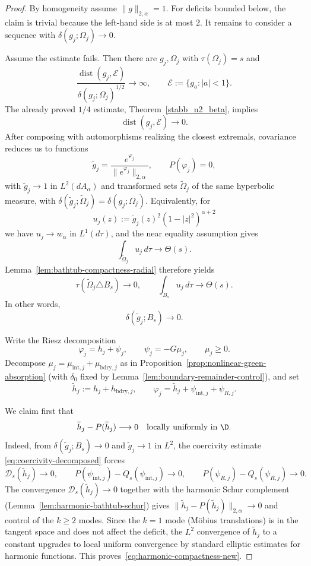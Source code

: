 \begin{proof}
By homogeneity assume $\|g\|_{2,\alpha}=1$. For deficits bounded below, the
claim is trivial because the left-hand side is at most $2$. It remains to
consider a sequence with $\delta(g_j;\Omega_j)\to0$.

Assume the estimate fails. Then there are $g_j,\Omega_j$ with
$\tau(\Omega_j)=s$ and
\[
\frac{\operatorname{dist}(g_j,\mathcal E)}
{\delta(g_j;\Omega_j)^{1/2}}\to\infty,
\qquad
\mathcal E:=\{g_a:|a|<1\}.
\]
The already proved $1/4$ estimate, Theorem~\ref{stabb_n2_beta}, implies
\[
\operatorname{dist}(g_j,\mathcal E)\to0.
\]
After composing with automorphisms realizing the closest extremals, covariance
reduces us to functions
\[
\widetilde g_j=\frac{e^{\varphi_j}}{\|e^{\varphi_j}\|_{2,\alpha}},
\qquad
P(\varphi_j)=0,
\]
with $\widetilde g_j\to1$ in $L^2(dA_\alpha)$ and transformed sets
$\widetilde\Omega_j$ of the same hyperbolic measure, with
$\delta(\widetilde g_j;\widetilde\Omega_j)=\delta(g_j;\Omega_j)$.
Equivalently, for
\[
u_j(z):=
\widetilde g_j(z)^2(1-|z|^2)^{\alpha+2}
\]
we have $u_j\to w_\alpha$ in $L^1(d\tau)$, and the near equality assumption
gives
\[
\int_{\widetilde\Omega_j}u_j\,d\tau\longrightarrow\Theta(s).
\]
Lemma~\ref{lem:bathtub-compactness-radial} therefore yields
\[
\tau(\widetilde\Omega_j\triangle B_s)\to0,
\qquad
\int_{B_s}u_j\,d\tau\to\Theta(s).
\]
In other words,
\[
\delta(\widetilde g_j;B_s)\to0.
\]

Write the Riesz decomposition
\[
\varphi_j=h_j+\psi_j,\qquad
\psi_j=-G\mu_j,\qquad \mu_j\ge0.
\]
Decompose $\mu_j=\mu_{\mathrm{int},j}+\mu_{\mathrm{bdry},j}$ as in
Proposition~\ref{prop:nonlinear-green-absorption} (with $\delta_0$ fixed by
Lemma~\ref{lem:boundary-remainder-control}), and set
\[
\widetilde h_j:=h_j+h_{\mathrm{bdry},j},\qquad
\varphi_j=\widetilde h_j+\psi_{\mathrm{int},j}+\psi_{R,j}.
\]

We claim first that
\begin{equation}\label{eq:harmonic-compactness-new}
\widetilde h_j-P(\widetilde h_j)\longrightarrow0
\quad\text{locally uniformly in }\D .
\end{equation}
Indeed, from $\delta(\widetilde g_j;B_s)\to0$ and
$\widetilde g_j\to1$ in $L^2$, the coercivity estimate
\eqref{eq:coercivity-decomposed} forces
\[
\mathcal D_s(\widetilde h_j)\to0,\qquad
P(\psi_{\mathrm{int},j})-Q_s(\psi_{\mathrm{int},j})\to0,\qquad
P(\psi_{R,j})-Q_s(\psi_{R,j})\to0.
\]
The convergence $\mathcal D_s(\widetilde h_j)\to0$ together with the harmonic
Schur complement (Lemma~\ref{lem:harmonic-bathtub-schur}) gives
$\|\widetilde h_j-P(\widetilde h_j)\|_{2,\alpha}\to0$ and control of the $k\ge2$ modes.
Since the $k=1$ mode (M\"obius translations) is in the tangent space and
does not affect the deficit, the $L^2$ convergence of $\widetilde h_j$ to a constant
upgrades to local uniform convergence by standard elliptic estimates for
harmonic functions.  This proves~\eqref{eq:harmonic-compactness-new}.


\end{proof}
